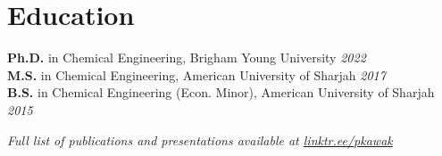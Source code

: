 \documentclass[letterpaper,12pt]{article}
\begin{document}
\vspace{-0.3\baselineskip}
\section*{Education}
\textbf{Ph.D.} in Chemical Engineering, Brigham Young University \hfill \textit{2022} \\
\textbf{M.S.} in Chemical Engineering, American University of Sharjah \hfill \textit{2017} \\
\textbf{B.S.} in Chemical Engineering (Econ. Minor), American University of Sharjah \hfill \textit{2015}

\vspace{0.5em}
\noindent\textit{Full list of publications and presentations available at \href{https://linktr.ee/pkawak}{linktr.ee/pkawak}}
\end{document}
